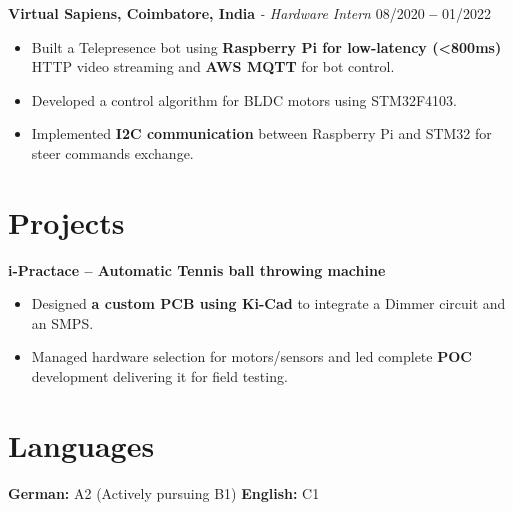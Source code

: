 \documentclass[letterpaper,11pt]{article}
\begin{document}
\vspace{8pt}
\noindent
\textbf{Virtual Sapiens, Coimbatore, India} \textit{- Hardware Intern} \hfill 08/2020 \textbf{--} 01/2022
\begin{itemize}[leftmargin=*]
    \item Built a Telepresence bot using \textbf{Raspberry Pi for low-latency (<800ms)} HTTP video streaming and \textbf{AWS MQTT} for bot control.
    \item Developed a control algorithm for BLDC motors using STM32F4103.
    \item Implemented \textbf{I2C communication} between Raspberry Pi and STM32 for steer commands exchange.
\end{itemize}

\section{Projects}
\textbf{i-Practace \textbf{--} Automatic Tennis ball throwing machine}
\begin{itemize}[leftmargin=*]
    \item Designed \textbf{a custom PCB using Ki-Cad} to integrate a Dimmer circuit and an SMPS.
    \item Managed hardware selection for motors/sensors and led complete \textbf{POC} development delivering it for field testing.
\end{itemize}


\section{Languages}
  \vspace{2pt}
  \textbf{German:} {A2 (Actively pursuing B1)} 
  \quad
  \textbf{English:} {C1}
\end{document}
